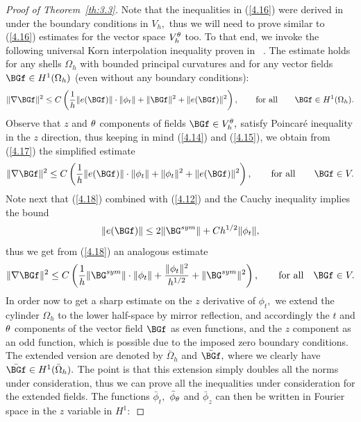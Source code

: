 \begin{proof}[Proof of Theorem~{\ref{th:3.3}}]
Note that the inequalities in (\ref{4.16}) were derived in \cite{bib:Gra.Har.4} under the boundary conditions in $V_h,$ thus we will need to prove similar to (\ref{4.16}) estimates for the vector space $V_h^\theta$ too. To that end, we invoke the following universal Korn interpolation inequality proven in ~\cite[Theorem~3.1]{bib:Harutyunyan.1}. The estimate holds for any shells $\Omega_h$ with bounded principal curvatures and for any vector fields $\BGf\in H^1(\Omega_h)$ (even without any boundary conditions):
\begin{equation}
\label{4.17}
\|\nabla\BGf\|^2\leq C\left(\frac{1}{h}\|e(\BGf)\|\cdot\|\phi_t\|+\|\BGf\|^2+\|e(\BGf)\|^2\right),\qquad\text{for all}\qquad \BGf\in H^1(\Omega_h).
\end{equation} 
Observe that $z$ and $\theta$ components of fields $\BGf\in V_h^\Gth,$ satisfy Poincar\'e inequality in the $z$ direction, thus keeping in mind (\ref{4.14}) and (\ref{4.15}), we obtain from (\ref{4.17}) the simplified estimate 
\begin{equation}
\label{4.18}
\|\nabla\BGf\|^2\leq C\left(\frac{1}{h}\|e(\BGf)\|\cdot\|\phi_t\|
+\|\phi_t\|^2+\|e(\BGf)\|^2\right),\qquad\text{for all}\qquad \BGf\in V.
\end{equation}
Note next that (\ref{4.18}) combined with (\ref{4.12}) and the Cauchy inequality implies the bound 
\begin{equation}
\label{4.19}
\|e(\BGf)\|\leq 2\|\BG^{sym}\|+ Ch^{1/2}\|\phi_t\|,
\end{equation}
thus we get from (\ref{4.18}) an analogous estimate 
\begin{equation}
\label{4.20}
\|\nabla\BGf\|^2\leq C\left(\frac{1}{h}\|\BG^{sym}\|\cdot\|\phi_t\|
+\frac{\|\phi_t\|^2}{h^{1/2}}+\|\BG^{sym}\|^2\right), \qquad\text{for all}\quad \BGf\in V.
\end{equation}
In order now to get a sharp estimate on the $z$ derivative of $\phi_t,$ we extend the cylinder $\Omega_h$ to the lower half-space by mirror reflection, and accordingly the $t$ and $\theta$ components of the vector field $\BGf$ as even functions, and the $z$ component as an odd function, which is possible due to the imposed zero boundary conditions. The extended version are denoted by $\bar\Omega_h$ and $\bar \BGf,$ where we clearly have $\bar\BGf\in H^1(\bar\Omega_h).$ 
The point is that this extension simply doubles all the norms under consideration, thus we can prove all the inequalities under consideration for the extended fields. 
The functions $\bar\phi_t,$ $\bar\phi_\theta$ and $\bar\phi_z$ can then be written in Fourier space in the $z$ variable in $H^{1}:$ 

\end{proof}
